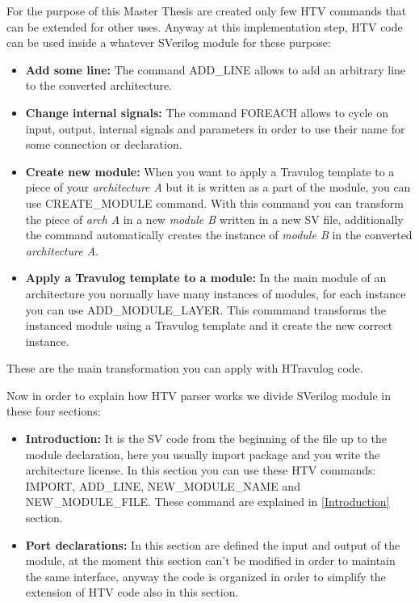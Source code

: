 {{        For the purpose of this Master Thesis are created only few HTV commands that can be extended for other uses. Anyway at this implementation step, HTV code can be used inside a whatever SVerilog module for these purpose:
        \begin{itemize}
            \item \textbf{Add some line:} The command ADD\_LINE allows to add an arbitrary line to the converted architecture.
            \item \textbf{Change internal signals:} The command FOREACH allows to cycle on input, output, internal signals and parameters in order to use their name for some connection or declaration.
            \item \textbf{Create new module:} When you want to apply a Travulog template to a piece of your \textit{architecture A} but it is written as a part of the module, you can use CREATE\_MODULE command. With this command you can transform the piece of \textit{arch A} in a new \textit{module B} written in a new SV file, additionally the command automatically creates the instance of \textit{module B} in the converted \textit{architecture A}. 

            \item \textbf{Apply a Travulog template to a module:} In the main module of an architecture you normally have many instances of modules, for each instance you can use ADD\_MODULE\_LAYER. This commmand transforms the instanced module using a Travulog template and it create the new correct instance.
        \end{itemize}
        
        These are the main transformation you can apply with HTravulog code.
        
        Now in order to explain how HTV parser works we divide SVerilog module in these four sections:
        
        \begin{itemize}
            \item \textbf{Introduction:} It is the SV code from the beginning of the file up to the module declaration, here you usually import package and you write the architecture license. In this section you can use these HTV commands: IMPORT, ADD\_LINE, NEW\_MODULE\_NAME and  NEW\_MODULE\_FILE. These command are explained in \ref{Introduction} section.
            
            \item \textbf{Port declarations:} In this section are defined the input and output of the module, at the moment this section can't be modified in order to maintain the same interface, anyway the code is organized in order to simplify the extension of HTV code also in this section.
            

\end{itemize}}}
